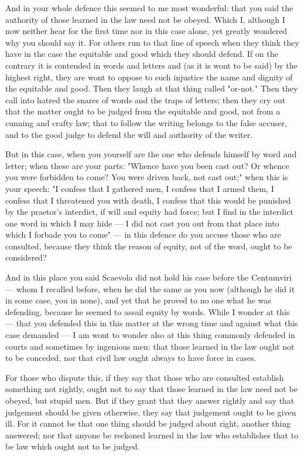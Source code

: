  And in your whole defence this seemed to me most wonderful: that you said the authority of those learned in the law need not be obeyed. Which I, although I now neither hear for the first time nor in this case alone, yet greatly wondered why you should say it. For others run to that line of speech when they think they have in the case the equitable and good which they should defend. If on the contrary it is contended in words and letters and (as it is wont to be said) by the highest right, they are wont to oppose to such injustice the name and dignity of the equitable and good. Then they laugh at that thing called "or-not." Then they call into hatred the snares of words and the traps of letters; then they cry out that the matter ought to be judged from the equitable and good, not from a cunning and crafty law; that to follow the writing belongs to the false accuser, and to the good judge to defend the will and authority of the writer.

 But in this case, when you yourself are the one who defends himself by word and letter; when these are your parts: "Whence have you been cast out? Or whence you were forbidden to come? You were driven back, not cast out;" when this is your speech: "I confess that I gathered men, I confess that I armed them, I confess that I threatened you with death, I confess that this would be punished by the praetor's interdict, if will and equity had force; but I find in the interdict one word in which I may hide --- I did not cast you out from that place into which I forbade you to come" --- in this defence do you accuse those who are consulted, because they think the reason of equity, not of the word, ought to be considered?

 And in this place you said Scaevola did not hold his case before the Centumviri --- whom I recalled before, when he did the same as you now (although he did it in some case, you in none), and yet that he proved to no one what he was defending, because he seemed to assail equity by words. While I wonder at this --- that you defended this in this matter at the wrong time and against what this case demanded --- I am wont to wonder also at this thing commonly defended in courts and sometimes by ingenious men: that those learned in the law ought not to be conceded, nor that civil law ought always to have force in cases.

 For those who dispute this, if they say that those who are consulted establish something not rightly, ought not to say that those learned in the law need not be obeyed, but stupid men. But if they grant that they answer rightly and say that judgement should be given otherwise, they say that judgement ought to be given ill. For it cannot be that one thing should be judged about right, another thing answered; nor that anyone be reckoned learned in the law who establishes that to be law which ought not to be judged.

